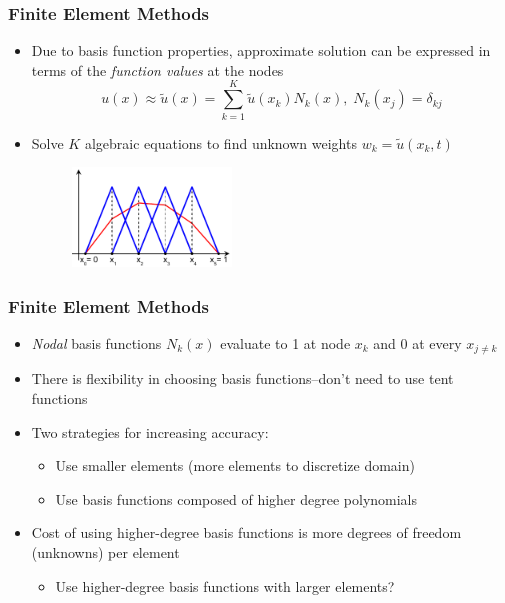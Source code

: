 \documentclass[serif,12pt]{beamer}
\begin{document}
\begin{frame}
\frametitle{Finite Element Methods}
\begin{itemize}
	\item Due to basis function properties, approximate solution can be expressed in terms of the \emph{function values} at the nodes
\[u(x) \approx \tilde{u}(x) = \displaystyle\sum_{k=1}^{K}\tilde{u}(x_k)N_k(x), \; N_k(x_j) = \delta_{kj} \]
	\item Solve $K$ algebraic equations to find unknown weights $w_k=\tilde{u}(x_k,t)$
\begin{figure}
    \includegraphics[width=0.40\textwidth]{figures/Finite_element_method_1D_illustration2.pdf}
    \let\thefootnote\relax{}
\end{figure}
\end{itemize}
\end{frame}

\begin{frame}
\frametitle{Finite Element Methods}
\begin{itemize}
	\item \emph{Nodal} basis functions $N_k(x)$ evaluate to 1 at node $x_k$ and 0 at every $x_{j\neq k}$
	\item There is flexibility in choosing basis functions--don't need to use tent functions
	\item Two strategies for increasing accuracy:
	\begin{itemize}
		\item Use smaller elements (more elements to discretize domain)
		\item Use basis functions composed of higher degree polynomials
	\end{itemize}
	\item Cost of using higher-degree basis functions is more degrees of freedom (unknowns) per element
	\begin{itemize}
		\item Use higher-degree basis functions with larger elements?
	\end{itemize}
\end{itemize}
\end{frame}
\end{document}

